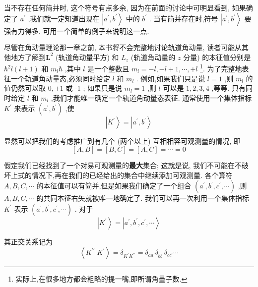 	当不存在任何简并时, 这个符号有点多余, 因为在前面的讨论中可明显看到, 如果确定了 ${a}^{\prime }$ ,我们就一定知道出现在 $\left| {{a}^{\prime },{b}^{\prime }}\right\rangle$ 中的 ${b}^{\prime }$ . 当有简并存在时,符号 $\left| {{a}^{\prime },{b}^{\prime }}\right\rangle$ 要强有力得多. 可用一个简单的例子来说明这一点.
	
	尽管在角动量理论那一章之前, 本书将不会完整地讨论轨道角动量, 读者可能从其他地方了解到${\mathbf{L}}^{2}$ (轨道角动量平方) 和 ${L}_{z}$ (轨道角动量的 $z$ 分量) 的本征值分别是 ${\hbar }^{2}l\left( {l + 1}\right)$ 和 ${m}_{l}\hbar$ ,其中 $l$ 是一个整数且 ${m}_{l} = - l, - l + 1,\cdots , + l$ \footnote{实际上,在很多地方都会粗略的提一嘴,即所谓角量子数.}. 为了完整地表征一个轨道角动量态,必须同时给定 $l$ 和 ${m}_{l}$ . 例如,如果我们只是说 $l = 1$ ,则 ${m}_{l}$ 的值仍然可以取 $0, + 1$ 或 -1 ; 如果只是说 ${m}_{l} = 1$ ,则 $l$ 可以是 $1,2,3,4$ ,等等. 只有同时给定 $l$ 和 ${m}_{l}$ ,我们才能唯一确定一个轨道角动量态表征. 通常使用一个集体指标 ${K}^{\prime }$ 来表示 $\left( {{a}^{\prime },{b}^{\prime }}\right)$ ,使
	\begin{equation}
		\left| {K}^{\prime }\right\rangle = \left| {{a}^{\prime },{b}^{\prime }}\right\rangle
	\end{equation}
	
	显然可以把我们的考虑推广到有几个 (两个以上) 互相相容可观测量的情况, 即
	\begin{equation}
		\left\lbrack {A, B}\right\rbrack = \left\lbrack {B, C}\right\rbrack = \left\lbrack {A, C}\right\rbrack = \cdots = 0
	\end{equation}
	
	假定我们已经找到了一个对易可观测量的\textbf{最大}集合; 这就是说, 我们不可能在不破坏上式的情况下,再在我们的已经给出的集合中继续添加可观测量. 各个算符 $A, B, C,\cdots$ 的本征值可以有简并,但是如果我们确定了一个组合 $\left( {{a}^{\prime },{b}^{\prime },{c}^{\prime },\cdots }\right)$ ,则 $A, B, C,\cdots$ 的共同本征右矢就被唯一地确定了. 我们可以再一次利用一个集体指标 ${K}^{\prime }$ 表示 $\left( {{a}^{\prime },{b}^{\prime },{c}^{\prime },\cdots }\right)$ . 对于
	\begin{equation}
		\left| {K}^{\prime }\right\rangle = \left| {{a}^{\prime },{b}^{\prime },{c}^{\prime },\cdots }\right\rangle
	\end{equation}
	
	其正交关系记为
	\begin{equation}
		\left\langle {{K}^{\prime \prime } | {K}^{\prime }}\right\rangle = {\delta }_{{K}^{\prime }{K}^{\prime \prime }} = {\delta }_{a{a}^{\prime }}{\delta }_{b{b}^{\prime }}{\delta }_{c{c}^{\prime }}\cdots
	\end{equation}
	

